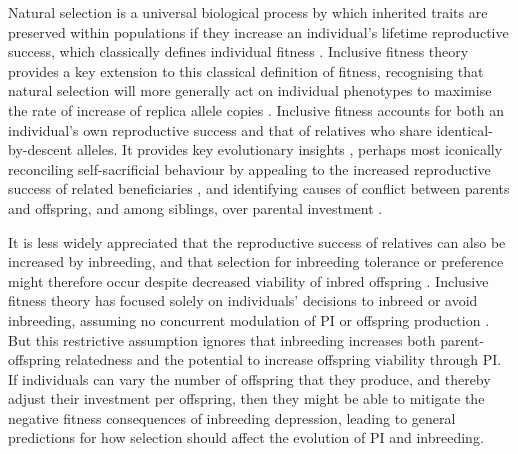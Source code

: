 \documentclass[12pt]{article}
\begin{document}
Natural selection is a universal biological process by which inherited traits are preserved within populations if they increase an individual's lifetime reproductive success, which classically defines individual fitness \cite[][]{Darwin1859, Dawkins1982}. Inclusive fitness theory \citeyearpar[][]{Hamilton1964, Hamilton1964a} provides a key extension to this classical definition of fitness, recognising that natural selection will more generally act on individual phenotypes to maximise the rate of increase of replica allele copies \cite[][]{Grafen2006}. Inclusive fitness accounts for both an individual's own reproductive success and that of relatives who share identical-by-descent alleles. It provides key evolutionary insights \cite[][]{Gardner2014}, perhaps most iconically reconciling self-sacrificial behaviour by appealing to the increased reproductive success of related beneficiaries \cite[][]{Hamilton1964}, and identifying causes of conflict between parents and offspring, and among siblings, over parental investment \cite[hereafter `PI';][]{Trivers1972, Trivers1974}.

It is less widely appreciated that the reproductive success of relatives can also be increased by inbreeding, and that selection for inbreeding tolerance or preference might therefore occur despite decreased viability of inbred offspring \cite[i.e., ``inbreeding depression''][]{Parker1979}. Inclusive fitness theory has focused solely on individuals' decisions to inbreed or avoid inbreeding, assuming no concurrent modulation of PI or offspring production \cite[e.g.,][]{Parker2006, Kokko2006, Duthie2015a}. But this restrictive assumption ignores that inbreeding increases both parent-offspring relatedness and the potential to increase offspring viability through PI. If individuals can vary the number of offspring that they produce, and thereby adjust their investment per offspring, then they might be able to mitigate the negative fitness consequences of inbreeding depression, leading to general predictions for how selection should affect the evolution of PI and inbreeding.
\end{document}

